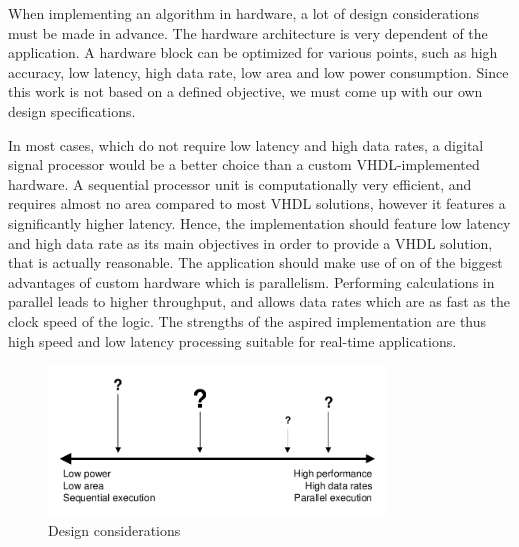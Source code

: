 \begin{refsection}
When implementing an algorithm in hardware, a lot of design considerations must be made in advance.
The hardware architecture is very dependent of the application.
A hardware block can be optimized for various points, such as high accuracy, low latency, high data rate, low area and low power consumption.
Since this work is not based on a defined objective, we must come up with our own design specifications.

In most cases, which do not require low latency and high data rates, a digital signal processor would be a better choice than a custom VHDL-implemented hardware.
A sequential processor unit is computationally very efficient, and requires almost no area compared to most VHDL solutions, however it features a significantly higher latency.
Hence, the implementation should feature low latency and high data rate as its main objectives in order to provide a VHDL solution, that is actually reasonable.
The application should make use of on of the biggest advantages of custom hardware which is parallelism.
Performing calculations in parallel leads to higher throughput, and allows data rates which are as fast as the clock speed of the logic.
The strengths of the aspired implementation are thus high speed and low latency processing suitable for real-time applications.
\begin{figure}
	\centering
	\includegraphics[width=0.8\textwidth]{./images/design_considerations.pdf}
	\caption{Design considerations \label{fpga:designcon}}
\end{figure}


\end{refsection}
